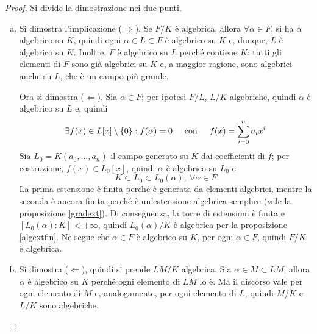 \documentclass[12pt]{scrartcl}
\theoremstyle{style}
\numberwithin{equation}{subsection}
\begin{document}
	\begin{proof}
		Si divide la dimostrazione nei due punti.
		\begin{enumerate}[(a).]
			\item Si dimostra l'implicazione ($\Rightarrow $).
				Se $F / K$ \`e algebrica, allora $\forall \alpha \in F$, si ha $\alpha $ algebrico su $K$, quindi ogni $\alpha \in L \subset F$ \`e algebrico su $K$ e, dunque, $L$ \`e algebrico su $K$.
				Inoltre, $F$ \`e algebrico su $L$ perch\'e contiene $K$: tutti gli elementi di $F$ sono gi\`a algebrici su $K$ e, a maggior ragione, sono algebrici anche su $L$, che \`e un campo pi\`u grande.

				Ora si dimostra ($\Leftarrow$).
				Sia $\alpha \in F$; per ipotesi $F / L$, $L / K$ algebriche, quindi $\alpha $ \`e algebrico su $L$ e, quindi
				\[
					\exists f(x) \in L[x] \setminus \left\{ 0 \right\} : f(\alpha ) = 0\hspace{.5cm} \text{con} \hspace{.5cm} f(x) = \sum_{i=0}^{n} a_i x^i
				\] 
				Sia $L_0 = K(a_0,\ldots,a_n)$ il campo generato su $K$ dai coefficienti di $f$; per costruzione, $f(x) \in L_0[x]$, quindi $\alpha $ \`e algebrico su $L_0$ e 
				\[
				K \subset L_0 \subset L_0(\alpha ) ,\ \forall \alpha \in F
				\] 
			La prima estensione \`e finita perch\'e \`e generata da elementi algebrici, mentre la seconda \`e ancora finita perch\'e \`e un'estensione algebrica semplice (vale la proposizione \ref{gradext}).
			Di conseguenza, la torre di estensioni \`e finita e $[L_0(\alpha ):K] < +\infty$, quindi $L_0(\alpha ) / K$ \`e algebrica per la proposizione \ref{algextfin}.
			Ne segue che $\alpha \in F$ \`e algebrico su $K$, per ogni $\alpha  \in F$, quindi $F / K $ \`e algebrica.
		\item Si dimostra ($\Leftarrow$), quindi si prende $LM / K$ algebrica. 
			Sia $\alpha  \in M \subset LM$; allora $\alpha $ \`e algebrico su $K$ perch\'e ogni elemento di $LM$ lo \`e.
			Ma il discorso vale per ogni elemento di $M$ e, analogamente, per ogni elemento di $L$, quindi $M / K$ e $L / K$ sono algebriche.


\end{enumerate}
\end{proof}
\end{document}
